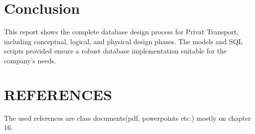 \documentclass[a4paper,12pt]{article}
\begin{document}
\section*{Conclusion}
This report shows the complete database design process for Privat Transport, including conceptual, logical, and physical design phases. The models and SQL scripts provided ensure a robust database implementation suitable for the company's needs.

\newpage
\section*{REFERENCES}
The used references are class documents(pdf, powerpoints etc.) mostly on chapter 16.
\end{document}
